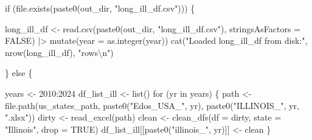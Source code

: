 \documentclass[
  11pt,
  letterpaper,
  DIV=11,
  numbers=noendperiod]{scrartcl}
\newenvironment{Shaded}{}{}
\newcommand{\AttributeTok}[1]{\textcolor[rgb]{0.84,0.23,0.29}{#1}}
\newcommand{\ConstantTok}[1]{\textcolor[rgb]{0.00,0.36,0.77}{#1}}
\newcommand{\ControlFlowTok}[1]{\textcolor[rgb]{0.84,0.23,0.29}{#1}}
\newcommand{\DecValTok}[1]{\textcolor[rgb]{0.00,0.36,0.77}{#1}}
\newcommand{\FunctionTok}[1]{\textcolor[rgb]{0.44,0.26,0.76}{#1}}
\newcommand{\NormalTok}[1]{\textcolor[rgb]{0.14,0.16,0.18}{#1}}
\newcommand{\OtherTok}[1]{\textcolor[rgb]{0.44,0.26,0.76}{#1}}
\newcommand{\SpecialCharTok}[1]{\textcolor[rgb]{0.00,0.36,0.77}{#1}}
\newcommand{\StringTok}[1]{\textcolor[rgb]{0.01,0.18,0.38}{#1}}
\begin{document}
\begin{Shaded}
\begin{Highlighting}[]
\ControlFlowTok{if}\NormalTok{ (}\FunctionTok{file.exists}\NormalTok{(}\FunctionTok{paste0}\NormalTok{(out\_dir, }\StringTok{"long\_ill\_df.csv"}\NormalTok{))) \{}

\NormalTok{  long\_ill\_df }\OtherTok{\textless{}{-}} \FunctionTok{read.csv}\NormalTok{(}\FunctionTok{paste0}\NormalTok{(out\_dir, }\StringTok{"long\_ill\_df.csv"}\NormalTok{),}
                           \AttributeTok{stringsAsFactors =} \ConstantTok{FALSE}\NormalTok{) }\SpecialCharTok{|\textgreater{}}
    \FunctionTok{mutate}\NormalTok{(}\AttributeTok{year =} \FunctionTok{as.integer}\NormalTok{(year))}
  \FunctionTok{cat}\NormalTok{(}\StringTok{"Loaded long\_ill\_df from disk:"}\NormalTok{, }\FunctionTok{nrow}\NormalTok{(long\_ill\_df), }\StringTok{"rows}\SpecialCharTok{\textbackslash{}n}\StringTok{"}\NormalTok{)}

\NormalTok{\} }\ControlFlowTok{else}\NormalTok{ \{}

\NormalTok{  years       }\OtherTok{\textless{}{-}} \DecValTok{2010}\SpecialCharTok{:}\DecValTok{2024}
\NormalTok{  df\_list\_ill }\OtherTok{\textless{}{-}} \FunctionTok{list}\NormalTok{()}
  \ControlFlowTok{for}\NormalTok{ (yr }\ControlFlowTok{in}\NormalTok{ years) \{}
\NormalTok{    path  }\OtherTok{\textless{}{-}} \FunctionTok{file.path}\NormalTok{(us\_states\_path,}
                       \FunctionTok{paste0}\NormalTok{(}\StringTok{"Edos\_USA\_"}\NormalTok{, yr),}
                       \FunctionTok{paste0}\NormalTok{(}\StringTok{"ILLINOIS\_"}\NormalTok{, yr, }\StringTok{".xlsx"}\NormalTok{))}
\NormalTok{    dirty }\OtherTok{\textless{}{-}} \FunctionTok{read\_excel}\NormalTok{(path)}
\NormalTok{    clean }\OtherTok{\textless{}{-}} \FunctionTok{clean\_dfs}\NormalTok{(}\AttributeTok{df =}\NormalTok{ dirty, }\AttributeTok{state =} \StringTok{"Illinois"}\NormalTok{, }\AttributeTok{drop =} \ConstantTok{TRUE}\NormalTok{)}
\NormalTok{    df\_list\_ill[[}\FunctionTok{paste0}\NormalTok{(}\StringTok{"illinois\_"}\NormalTok{, yr)]] }\OtherTok{\textless{}{-}}\NormalTok{ clean}
\NormalTok{  \}}


\end{Highlighting}
\end{Shaded}
\end{document}
